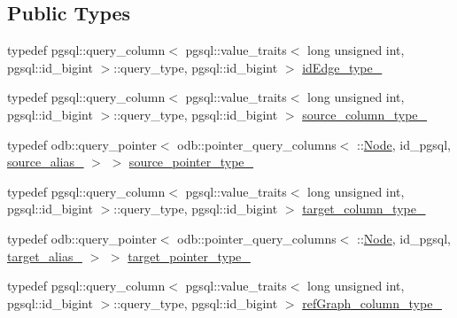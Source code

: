 \subsection*{Public Types}
\begin{DoxyCompactItemize}
\item 
typedef pgsql\+::query\+\_\+column$<$ pgsql\+::value\+\_\+traits$<$ long unsigned int, pgsql\+::id\+\_\+bigint $>$\+::query\+\_\+type, pgsql\+::id\+\_\+bigint $>$ \hyperlink{structodb_1_1query__columns_3_01_1_1_edge_00_01id__pgsql_00_01_a_01_4_ac2099ffe11e8c8289cfaa30be075ece5}{id\+Edge\+\_\+type\+\_\+}
\item 
typedef pgsql\+::query\+\_\+column$<$ pgsql\+::value\+\_\+traits$<$ long unsigned int, pgsql\+::id\+\_\+bigint $>$\+::query\+\_\+type, pgsql\+::id\+\_\+bigint $>$ \hyperlink{structodb_1_1query__columns_3_01_1_1_edge_00_01id__pgsql_00_01_a_01_4_a9fe5ac5b9cd38d44a2420d62629076fe}{source\+\_\+column\+\_\+type\+\_\+}
\item 
typedef odb\+::query\+\_\+pointer$<$ odb\+::pointer\+\_\+query\+\_\+columns$<$ \+::\hyperlink{class_node}{Node}, id\+\_\+pgsql, \hyperlink{structodb_1_1query__columns__base_3_01_1_1_edge_00_01id__pgsql_01_4_a84e91c6138f19476b1c2d0d9ef440209}{source\+\_\+alias\+\_\+} $>$ $>$ \hyperlink{structodb_1_1query__columns_3_01_1_1_edge_00_01id__pgsql_00_01_a_01_4_aba8b61cdeb2c359f6cc1e53aac7d1e71}{source\+\_\+pointer\+\_\+type\+\_\+}
\item 
typedef pgsql\+::query\+\_\+column$<$ pgsql\+::value\+\_\+traits$<$ long unsigned int, pgsql\+::id\+\_\+bigint $>$\+::query\+\_\+type, pgsql\+::id\+\_\+bigint $>$ \hyperlink{structodb_1_1query__columns_3_01_1_1_edge_00_01id__pgsql_00_01_a_01_4_a6a5cf515c948a27412f493cfe21d7113}{target\+\_\+column\+\_\+type\+\_\+}
\item 
typedef odb\+::query\+\_\+pointer$<$ odb\+::pointer\+\_\+query\+\_\+columns$<$ \+::\hyperlink{class_node}{Node}, id\+\_\+pgsql, \hyperlink{structodb_1_1query__columns__base_3_01_1_1_edge_00_01id__pgsql_01_4_ab87aa44ce979953bb90a322eba2a996d}{target\+\_\+alias\+\_\+} $>$ $>$ \hyperlink{structodb_1_1query__columns_3_01_1_1_edge_00_01id__pgsql_00_01_a_01_4_a514ebc8051388738a437107b5cb4038f}{target\+\_\+pointer\+\_\+type\+\_\+}
\item 
typedef pgsql\+::query\+\_\+column$<$ pgsql\+::value\+\_\+traits$<$ long unsigned int, pgsql\+::id\+\_\+bigint $>$\+::query\+\_\+type, pgsql\+::id\+\_\+bigint $>$ \hyperlink{structodb_1_1query__columns_3_01_1_1_edge_00_01id__pgsql_00_01_a_01_4_ab076999f6fdd1d991b3ccec1899e2618}{ref\+Graph\+\_\+column\+\_\+type\+\_\+}

\end{DoxyCompactItemize}
